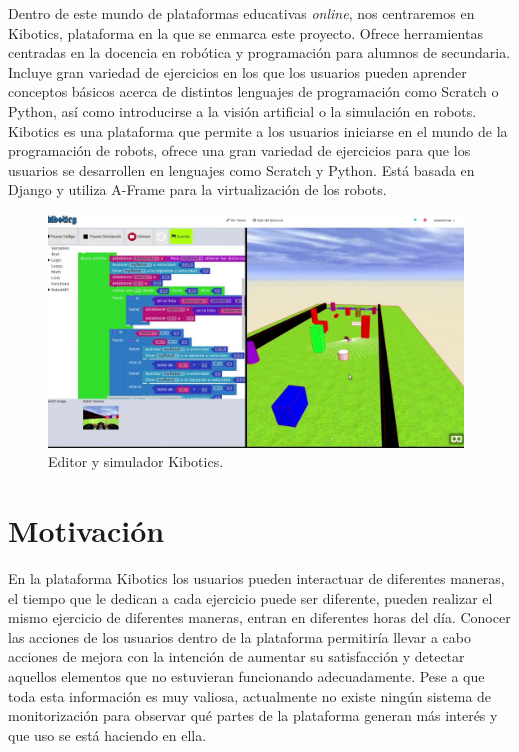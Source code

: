 \documentclass[a4paper, 12pt]{book}
\begin{document}
		Dentro de este mundo de plataformas educativas \textit{online}, nos centraremos en Kibotics, plataforma en la que se enmarca este proyecto. Ofrece herramientas centradas en la docencia en robótica y programación para alumnos de secundaria. Incluye gran variedad de ejercicios en los que los usuarios pueden aprender conceptos básicos acerca de distintos lenguajes de programación como Scratch o Python, así como introducirse a la visión artificial o la simulación en robots. Kibotics es una plataforma que permite a los usuarios iniciarse en el mundo de la programación de robots, ofrece una gran variedad de ejercicios para que los usuarios se desarrollen en lenguajes como Scratch y Python. Está basada en Django y utiliza A-Frame para la virtualización de los robots.\\
		
		\begin{figure}[H]
			\centering
			\includegraphics[width=11cm, keepaspectratio]{img/editor_simulador_kibotics.jpg}
			\caption{Editor y simulador Kibotics.}
			\label{fig:editor_simulador_kibotics}
		\end{figure}


	\section{Motivación}
	\label{sec:motivación}
		
		En la plataforma Kibotics los usuarios pueden interactuar de diferentes maneras, el tiempo que le dedican a cada ejercicio puede ser diferente, pueden realizar el mismo ejercicio de diferentes maneras, entran en diferentes horas del día. Conocer las acciones de los usuarios dentro de la plataforma permitiría llevar a cabo acciones de mejora con la intención de aumentar su satisfacción y detectar aquellos elementos que no estuvieran funcionando adecuadamente. Pese a que toda esta información es muy valiosa, actualmente no existe ningún sistema de monitorización para observar qué partes de la plataforma generan más interés y que uso se está haciendo en ella.  \\
\end{document}
